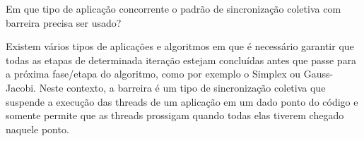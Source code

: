 \question Em que tipo de aplicação concorrente o padrão de sincronização coletiva com barreira precisa ser usado?
\begin{solution}
    Existem vários tipos de aplicações e algoritmos em que é necessário garantir que todas as etapas de determinada iteração estejam concluídas antes que passe para a próxima fase/etapa do algoritmo, como por exemplo o Simplex ou Gauss-Jacobi. Neste contexto, a barreira é um tipo de sincronização coletiva que suspende a execução das threads de um aplicação em um dado ponto do código e somente permite que as threads prossigam quando todas elas tiverem chegado naquele ponto.
\end{solution}

